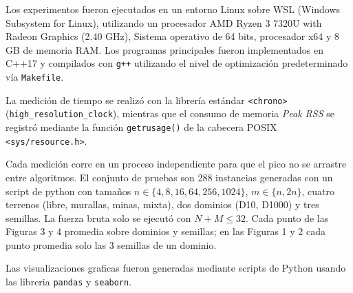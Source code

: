 Los experimentos fueron ejecutados en un entorno Linux
sobre WSL (Windows Subsystem for Linux), utilizando un
procesador AMD Ryzen 3 7320U with Radeon Graphics (2.40 GHz),
Sistema operativo de 64 bits, procesador x64 y 8 GB de memoria
RAM. Los programas principales fueron implementados en C++17
y compilados con \texttt{g++} utilizando el nivel de
optimización predeterminado vía \texttt{Makefile}. 

\vspace{0.4cm}

La medición de tiempo se realizó con la librería estándar
\texttt{<chrono>} (\texttt{high\_resolution\_clock}),
mientras que el consumo de memoria \textit{Peak RSS} se
registró mediante la función \texttt{getrusage()} de la
cabecera POSIX \texttt{<sys/resource.h>}. 

\vspace{0.4cm}

Cada medición corre en un proceso independiente para que 
el pico no se arrastre entre algoritmos. El conjunto de 
pruebas son 288 instancias generadas con un script de python 
con tamaños $n \in \{4, 8, 16, 64, 256, 1024\}$, 
$m \in \{n, 2n\}$, cuatro terrenos (libre, murallas, minas, mixta), 
dos dominios (D10, D1000) y tres semillas. La fuerza bruta 
solo se ejecutó con $N+M \le 32$. Cada punto de las Figuras 3 y 4 
promedia sobre dominios y semillas; en las Figuras 1 y 2 cada 
punto promedia solo las 3 semillas de un dominio. 

\vspace{0.4cm}

Las visualizaciones graficas fueron generadas mediante
scripts de Python usando las libreria \texttt{pandas} y
\texttt{seaborn}.
